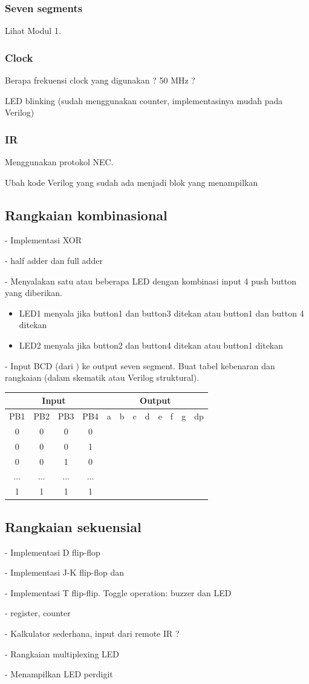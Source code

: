 \subsubsection{Seven segments}

Lihat Modul 1.

\subsubsection{Clock}
{\color{red} Berapa frekuensi clock yang digunakan ? 50 MHz ?}

LED blinking (sudah menggunakan counter, implementasinya
mudah pada Verilog)

\subsubsection{IR}
Menggunakan protokol NEC.

Ubah kode Verilog yang sudah ada menjadi blok yang menampilkan

\subsection{Rangkaian kombinasional}

- Implementasi XOR

- half adder dan full adder

- Menyalakan satu atau beberapa LED dengan kombinasi input
4 push button yang diberikan.
\begin{itemize}
\item LED1 menyala jika button1 dan button3 ditekan atau button1 dan button 4 ditekan
\item LED2 menyala jika button2 dan button4 ditekan atau button1 ditekan
\end{itemize}

- Input BCD (dari ) ke output seven segment. Buat tabel kebenaran dan rangkaian (dalam skematik
atau Verilog struktural).

{\centering
\begin{tabular}{|c|c|c|c||c|c|c|c|c|c|c|c|}
\hline
\multicolumn{4}{|c||}{Input} & \multicolumn{8}{|c|}{Output} \\
\hline
PB1 & PB2 & PB3 & PB4 & a & b & c & d & e & f & g & dp \\
\hline
0 & 0 & 0 & 0 &  &  &  &  &  &  &  & \\
0 & 0 & 0 & 1 &  &  &  &  &  &  &  & \\
0 & 0 & 1 & 0 &  &  &  &  &  &  &  & \\
... & ... & ... & ... &  &  &  &  &  &  &  & \\
1 & 1 & 1 & 1 &  &  &  &  &  &  &  & \\
\hline
\end{tabular}
\par}


\subsection{Rangkaian sekuensial}

- Implementasi D flip-flop

- Implementasi J-K flip-flop dan

- Implementasi T flip-flip. Toggle operation: buzzer dan LED

- register, counter

- Kalkulator sederhana, input dari remote IR ?

- Rangkaian multiplexing LED

- Menampilkan LED perdigit


